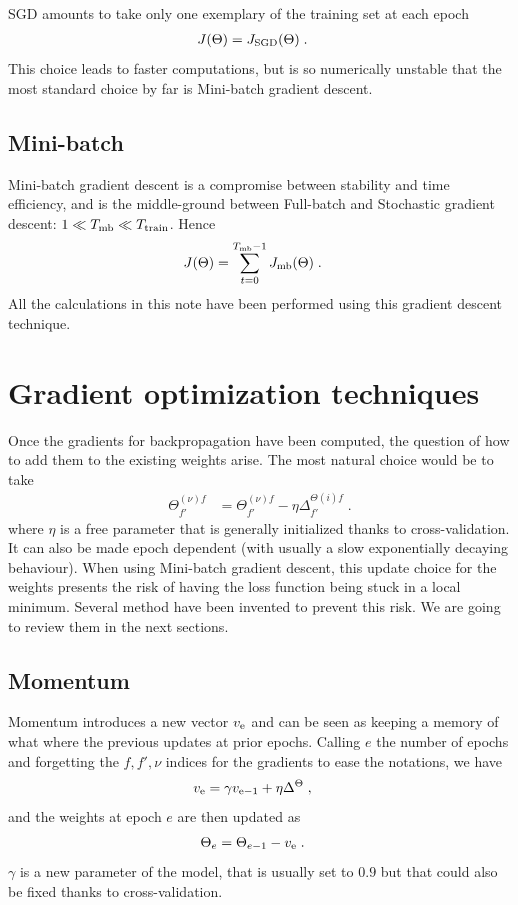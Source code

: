 SGD amounts to take only one exemplary of the training set at each epoch
\begin{align}
J(\Theta)&=J_{{\rm SGD}}(\Theta)\;.
\end{align}
This choice leads to faster computations, but is so numerically unstable that the most standard choice by far is Mini-batch gradient descent.

\subsection{Mini-batch}

Mini-batch gradient descent is a compromise between stability and time efficiency, and is the middle-ground between Full-batch and Stochastic gradient descent: $1\ll T_{{\rm mb}}\ll T_{{\rm train}}$. Hence
\begin{align}
J(\Theta)&=\sum_{t=0}^{T_{{\rm mb}}-1}J_{{\rm mb}}(\Theta)\;.
\end{align}
All the calculations in this note have been performed using this gradient descent technique.

\section{Gradient optimization techniques}

Once the gradients for backpropagation have been computed, the question of how to add them to the existing weights arise. The most natural choice would be to take 
\begin{align}
\Theta^{(\nu)f}_{f'}&=\Theta^{(\nu)f}_{f'}-\eta\Delta^{\Theta(i)f}_{f'}\;.
\end{align}
where $\eta$ is a free parameter that is generally initialized thanks to cross-validation. It can also be made epoch dependent (with usually a slow exponentially decaying behaviour). When using Mini-batch gradient descent, this update choice for the weights presents the risk of having the loss function being stuck in a local minimum. Several method have been invented to prevent this risk. We are going to review them in the next sections.


\subsection{Momentum}

Momentum\cite{QIAN1999145} introduces a new vector $v_{{\rm e}}$ and can be seen as keeping a memory of what where the previous updates at prior epochs. Calling $e$ the number of epochs and forgetting the $f,f',\nu$ indices for the gradients to ease the notations, we have
\begin{align}
v_{{\rm e}}&=\gamma v_{{\rm e-1}}+\eta \Delta^{\Theta}\;,
\end{align}
and the weights at epoch $e$ are then updated as
\begin{align}
\Theta_e&=\Theta_{e-1}-v_{{\rm e}}\;.
\end{align}
$\gamma$ is a new parameter of the model, that is usually set to $0.9$ but that could also be fixed thanks to cross-validation.

